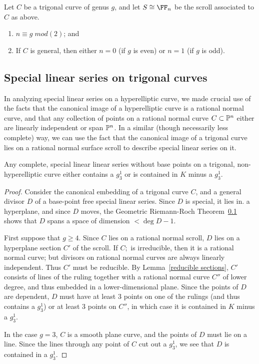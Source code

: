 \begin{lemma}
Let $C$ be a trigonal curve of genus $g$, and let $S \cong \FF_n$ be the scroll associated to $C$ as above. 
\begin{enumerate}
\item $n \equiv g \; mod (2)$; and
\item If $C$ is general, then  either  $n=0$ (if $g$ is even) or $n=1$ (if $g$ is odd).
\end{enumerate}\end{lemma}

\subsection{Special linear series on trigonal curves}

In analyzing special linear series on a hyperelliptic curve, we made crucial use of the facts that the canonical image of a hyperelliptic curve is a rational normal curve, and that any collection of points on a rational normal curve $C \subset \PP^n$ either are linearly independent or span $\PP^n$. In a similar (though necessarily less complete) way, we can use the fact that the canonical image of a trigonal curve lies on a rational normal surface scroll to describe special linear series on it.

\begin{theorem}
 Any complete, special linear linear series without base points on a trigonal, non-hyperelliptic curve either contains a $g^1_3$ or is contained in $K$ minus a $g^1_3$.
\end{theorem}

\begin{proof}
Consider the canonical embedding of a trigonal curve $C$, and a general divisor $D$ of a base-point free special linear series. Since $D$ is special, it lies in. a hyperplane, and since $D$ moves, the Geometric Riemann-Roch Theorem~\ref{} shows that  $D$ spans a space of dimension $<\deg D-1$.  

First suppose that $g\geq 4$. Since $C$ lies on a rational normal scroll, $D$ lies on a hyperplane section $C'$ of the scroll. If $C;$  is irreducible, then it is a rational normal curve; but divisors on rational normal curves are always linearly independent. Thus $C'$ must be reducible. By Lemma~\ref{reducible sections}, $C'$ consists of lines of the ruling together with a rational normal curve $C''$ of lower degree, and thus embedded in a lower-dimensional plane. Since the points of $D$ are dependent, $D$ must have at least 3 points on one of the rulings (and thus contains a $g^1_3$) or at least 3 points on $C''$, in which case it is contained in $K$ minus a $g^1_3.$

In the case $g =3$, $C$ is a smooth plane curve, and the points of $D$ must lie on a line. Since the lines through any point of $C$ cut out a $g^1_3$, we see that $D$ is contained in a $g^1_3$. 
\end{proof}

